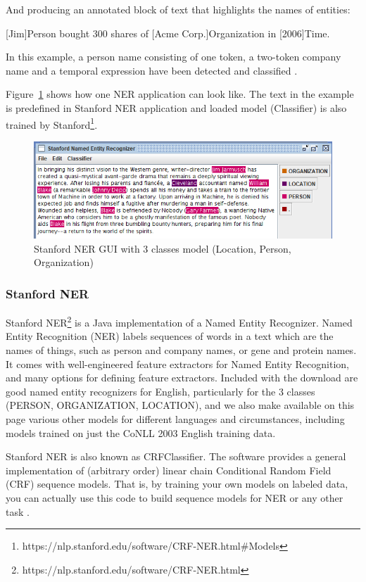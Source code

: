 \documentclass[thesis=M,english]{FITthesis}[2018/05/30]
\begin{document}
And producing an annotated block of text that highlights the names of entities:

[Jim]Person bought 300 shares of [Acme Corp.]Organization in [2006]Time.

In this example, a person name consisting of one token, a two-token company name and a temporal expression have been detected and classified \cite{wiki:NER}.

	Figure~\ref{fig:StanfordNER} shows how one NER application can look like. The text in the example is predefined in Stanford NER application and loaded model (Classifier) is also trained by Stanford\footnote{https://nlp.stanford.edu/software/CRF-NER.html\#Models}.

	\begin{figure}[H]\centering
		\includegraphics[width=\textwidth]{NER-Stanford}
		\caption{Stanford NER GUI with 3 classes model (Location, Person, Organization)}\label{fig:StanfordNER}
	\end{figure}
	

\subsubsection{Stanford NER}\label{Stanford NER}
Stanford NER\footnote{https://nlp.stanford.edu/software/CRF-NER.html} is a Java implementation of a Named Entity Recognizer. Named Entity Recognition (NER) labels sequences of words in a text which are the names of things, such as person and company names, or gene and protein names. It comes with well-engineered feature extractors for Named Entity Recognition, and many options for defining feature extractors. Included with the download are good named entity recognizers for English, particularly for the 3 classes (PERSON, ORGANIZATION, LOCATION), and we also make available on this page various other models for different languages and circumstances, including models trained on just the CoNLL 2003 English training data.

Stanford NER is also known as CRFClassifier. The software provides a general implementation of (arbitrary order) linear chain Conditional Random Field (CRF) sequence models. That is, by training your own models on labeled data, you can actually use this code to build sequence models for NER or any other task \cite{article:StanfordNER}.
\end{document}
